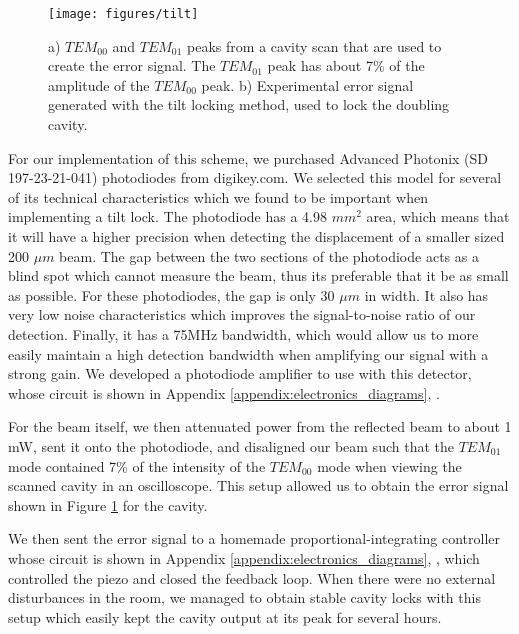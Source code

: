 \begin{figure}[!ht] 
 \centering    
 \texttt{[image: figures/tilt]}   
 \caption[Experimental tilt locking error signal]{a) $TEM_{00}$ and $TEM_{01}$
peaks from a cavity scan that are used to create the error signal.  The
$TEM_{01}$ peak has about 7\% of the amplitude of the $TEM_{00}$ peak.  b)  Experimental error signal generated with the tilt locking method, used to lock the doubling cavity.} 
 \label{fig:tilt_peaks_and_error} 
\end{figure}


For our implementation of this scheme, we purchased Advanced Photonix (SD 197-23-21-041) photodiodes from digikey.com.  We selected this model for several of its technical characteristics which we found to be important when implementing a tilt lock.  The photodiode has a 4.98 $mm^2$ area, which means that it will have a higher precision when detecting the displacement of a smaller sized 200 $\mu m$ beam.  The gap between the two sections of the photodiode acts as a blind spot which cannot measure the beam, thus its preferable that it be as small as possible.  For these photodiodes, the gap is only 30 $\mu m$ in width.  It also has very low noise characteristics which improves the signal-to-noise ratio of our detection.  Finally, it has a 75MHz bandwidth, which would allow us to more easily maintain a high detection bandwidth when amplifying our signal with a strong gain.  We developed a photodiode amplifier to use with this detector, whose circuit is shown in Appendix \ref{appendix:electronics_diagrams}, .

For the beam itself, we then attenuated power from the reflected beam to about
1 mW, sent it onto the photodiode, and disaligned our beam such that the
$TEM_{01}$ mode contained 7\% of the intensity of the $TEM_{00}$ mode when viewing the scanned cavity in an oscilloscope.  This setup allowed us to obtain the error signal shown in Figure \ref{fig:tilt_peaks_and_error} for the cavity.

We then sent the error signal to a homemade proportional-integrating controller  whose circuit is shown in Appendix \ref{appendix:electronics_diagrams}, , which controlled the piezo and closed the feedback loop.  When there were no external disturbances in the room, we managed to obtain stable cavity locks with this setup which easily kept the cavity output at its peak for several hours.




